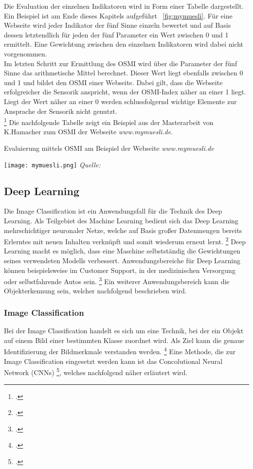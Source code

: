 Die Evaluation der einzelnen Indikatoren wird in Form einer Tabelle dargestellt. Ein Beispiel ist am Ende dieses Kapitels aufgeführt ~\ref{fig:mymuesli}.
Für eine Webseite wird jeder Indikator der fünf Sinne einzeln bewertet und auf Basis dessen letztendlich für jeden der fünf Parameter ein Wert zwischen 0 und 1 ermittelt.
Eine Gewichtung zwischen den einzelnen Indikatoren wird dabei nicht vorgenommen. \\
Im letzten Schritt zur Ermittlung des \ac{OSMI} wird über die Parameter der fünf Sinne das arithmetische Mittel berechnet.
Dieser Wert liegt ebenfalls zwischen 0 und 1 und bildet den \ac{OSMI} einer Webseite. Dabei gilt, dass die Webseite erfolgreicher die Sensorik anspricht, wenn der OSMI-Index näher an einer 1 liegt.
Liegt der Wert näher an einer 0 werden schlussfolgernd wichtige Elemente zur Ansprache der Sensorik nicht genutzt. \\ \footcite[\vglf][ \& 58]{hamacher2018}
Die nachfolgende Tabelle zeigt ein Beispiel aus der Masterarbeit von K.Hamacher zum \ac{OSMI} der Webseite \textit{www.mymuesli.de}.

\begin{table}[H]
    \caption{Evaluierung mittels \ac{OSMI} am Beispiel der Webseite \textit{www.mymuesli.de}}\label{fig:mymuesli}
    \texttt{[image: mymuesli.png]}
    \textit{Quelle:~\cite[][]{hamacher2018}}
\end{table}

\subsection{Deep Learning}

Die Image Classification ist ein Anwendungsfall für die Technik des Deep Learning.
Als Teilgebiet des Machine Learning bedient sich das Deep Learning mehrschichtiger neuronaler Netze, welche auf Basis großer Datenmengen bereits Erlerntes mit neuen Inhalten verknüpft und somit wiederum erneut lernt. \footcite[\vglf][ \& 3]{plaat2022}
Deep Learning macht es möglich, dass eine Maschine selbstständig die Gewichtungen seines verwendeten Modells verbessert.
Anwendungsbereiche für Deep Learning können beispielsweise im Customer Support, in der medizinischen Versorgung oder selbstfahrende Autos sein. \footcite[\vglf][ \& 511]{handa2021}
Ein weiterer Anwendungsbereich kann die Objekterkennung sein, welcher nachfolgend beschrieben wird.

\subsubsection{Image Classification}
Bei der Image Classification handelt es sich um eine Technik, bei der ein Objekt auf einem Bild einer bestimmten Klasse zuordnet wird. Als Ziel kann die genaue Identifizierung der Bildmerkmale verstanden werden. \footcite[\vglf][]{internationalconferenceoncomputercommunicationandinformatics2021}
Eine Methode, die zur Image Classification eingesetzt werden kann ist das Concolutional Neural Network (\acp{CNN}) \footcite[\vglf][]{internationalconferenceonadvancesinelectronics2018}, welches nachfolgend näher erläutert wird.

